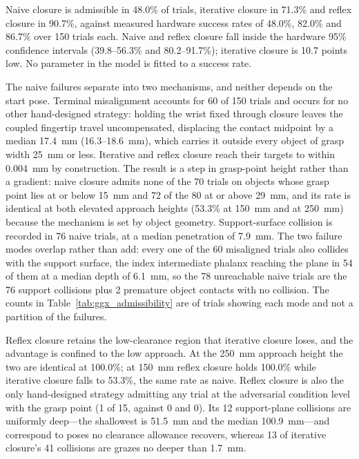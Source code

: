Naive closure is admissible in 48.0\% of trials, iterative closure in 71.3\% and
reflex closure in 90.7\%, against measured hardware success rates of 48.0\%,
82.0\% and 86.7\% over 150 trials each. Naive and reflex closure fall inside the
hardware 95\% confidence intervals (39.8--56.3\% and 80.2--91.7\%); iterative
closure is 10.7 points low. No parameter in the model is fitted to a success
rate.

The naive failures separate into two mechanisms, and neither depends on the start
pose. Terminal misalignment accounts for 60 of 150 trials and occurs for no other
hand-designed strategy: holding the wrist fixed through closure leaves the
coupled fingertip travel uncompensated, displacing the contact midpoint by a
median \SI{17.4}{\milli\metre} (\SI{16.3}{}--\SI{18.6}{\milli\metre}), which
carries it outside every object of grasp width \SI{25}{\milli\metre} or less.
Iterative and reflex closure reach their targets to within
\SI{0.004}{\milli\metre} by construction. The result is a step in grasp-point
height rather than a gradient: naive closure admits none of the 70 trials on
objects whose grasp point lies at or below \SI{15}{\milli\metre} and 72 of the 80
at or above \SI{29}{\milli\metre}, and its rate is identical at both elevated
approach heights (53.3\% at \SI{150}{\milli\metre} and at
\SI{250}{\milli\metre}) because the mechanism is set by object geometry.
Support-surface collision is recorded in 76 naive trials, at a median
penetration of \SI{7.9}{\milli\metre}. The two failure modes overlap rather
than add: every one of the 60 misaligned trials also collides with the support
surface, the index intermediate phalanx reaching the plane in 54 of them at a
median depth of \SI{6.1}{\milli\metre}, so the 78 unreachable naive trials are
the 76 support collisions plus 2 premature object contacts with no collision.
The counts in Table~\ref{tab:ggx_admissibility} are of trials showing each mode
and not a partition of the failures.

Reflex closure retains the low-clearance region that iterative closure loses, and
the advantage is confined to the low approach. At the \SI{250}{\milli\metre}
approach height the two are identical at 100.0\%; at \SI{150}{\milli\metre}
reflex closure holds 100.0\% while iterative closure falls to 53.3\%, the same
rate as naive. Reflex closure is also the only hand-designed strategy admitting
any trial at the adversarial condition level with the grasp point (1 of 15,
against 0 and 0). Its 12 support-plane collisions are uniformly deep---the
shallowest is \SI{51.5}{\milli\metre} and the median
\SI{100.9}{\milli\metre}---and correspond to poses no clearance allowance
recovers, whereas 13 of iterative closure's 41 collisions are grazes no deeper
than \SI{1.7}{\milli\metre}.

